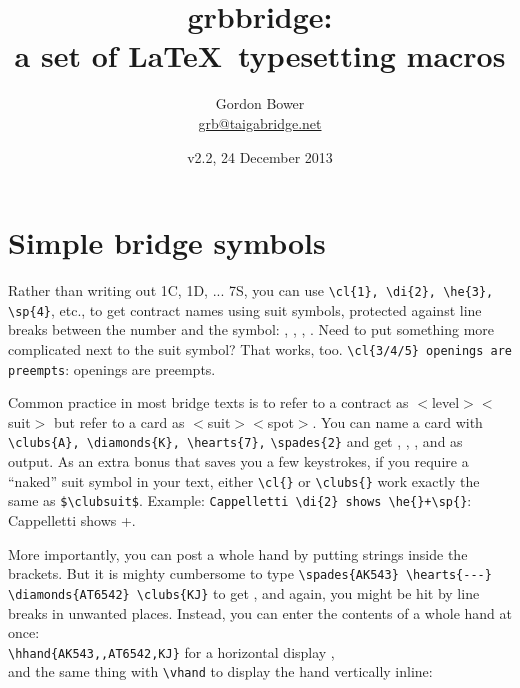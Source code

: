 \documentclass[10pt]{article}%
\begin{document}
\title{grbbridge:\\ a set of \LaTeX\ typesetting macros}
\author{Gordon Bower \\ \url{grb@taigabridge.net}}
\date{v2.2, 24 December 2013}
\maketitle

\section{Simple bridge symbols}

Rather than writing out 1C, 1D, ... 7S, you can use \verb+\cl{1}, \di{2}, \he{3}, \sp{4}+, etc., to get contract names using suit symbols, protected against line breaks between the number and the symbol: , , , . Need to put something more complicated next to the suit symbol? That works, too. \verb+\cl{3/4/5} openings are preempts+:  openings are preempts.

Common practice in most bridge texts is to refer to a contract as $<$level$><$suit$>$ but refer to a card as $<$suit$><$spot$>$. You can name a card with \verb+\clubs{A}, \diamonds{K}, \hearts{7},+ \verb+\spades{2}+ and get , , , and  as output. As an extra bonus that saves you a few keystrokes, if you require a ``naked'' suit symbol in your text, either \verb+\cl{}+ or \verb+\clubs{}+ work exactly the same as \verb+$\clubsuit$+. Example: \verb!Cappelletti \di{2} shows \he{}+\sp{}!: Cappelletti  shows \he{}+\sp{}.

More importantly, you can post a whole hand by putting strings inside the brackets. But it is mighty cumbersome to type \verb+\spades{AK543} \hearts{---} \diamonds{AT6542} \clubs{KJ}+ to get  \hearts{---}  , and again, you might be hit by line breaks in unwanted places. Instead, you can enter the contents of a whole hand at once:\\ \verb+\hhand{AK543,,AT6542,KJ}+ for a horizontal display  ,\\ 
 and the same thing with \verb+\vhand+ to display the hand vertically inline: 
\end{document}
